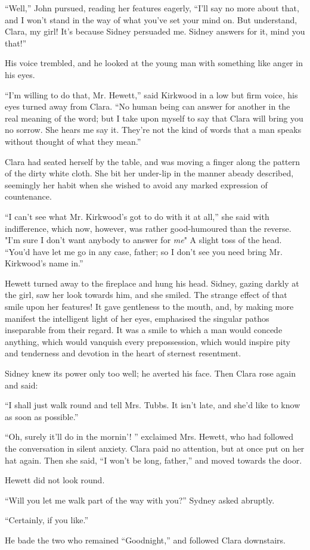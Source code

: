 ``Well,'' John pursued, reading her features eagerly, ``I'll say no more
about that, and I won't stand in the way of what you've set your mind
on. But understand, Clara, my girl! It's because Sidney persuaded me.
Sidney answers for it, mind you that!''

His voice trembled, and he looked at the young man with something like
anger in his eyes.

``I'm willing to do that, Mr. Hewett,'' said Kirkwood in a low but firm
voice, his eyes turned away from Clara. ``No human being can answer for
another in the real meaning of the word; but I take upon myself to say
that Clara will bring you no sorrow. She hears me say it. They're not
the kind of words that a man speaks without thought of what they mean.''

Clara had seated herself by the table, and was moving a finger along the
pattern of the dirty white cloth. She bit her under-lip in the manner
abeady described, seemingly {}her habit when she wished to avoid any
marked expression of countenance.

``I can't see what Mr. Kirkwood's got to do with it at all,'' she said
with indifference, which now, however, was rather good-humoured than the
reverse. "I'm sure I don't want anybody to answer for \emph{me}" A
slight toss of the head. ``You'd have let me go in any case, father; so
I don't see you need bring Mr. Kirkwood's name in.''

Hewett turned away to the fireplace and hung his head. Sidney, gazing
darkly at the girl, saw her look towards him, and she smiled. The
strange effect of that smile upon her features! It gave gentleness to
the mouth, and, by making more manifest the intelligent light of her
eyes, emphasised the singular pathos inseparable from their regard. It
was a smile to which a man would concede anything, which would vanquish
every prepossession, which would inspire pity and tenderness and
devotion in the heart of sternest resentment.

Sidney knew its power only too well; he {}averted his face. Then Clara
rose again and said:

``I shall just walk round and tell Mrs. Tubbs. It isn't late, and she'd
like to know as soon as possible.''

``Oh, surely it'll do in the mornin'! '' exclaimed Mrs. Hewett, who had
followed the conversation in silent anxiety. Clara paid no attention,
but at once put on her hat again. Then she said, ``I won't be long,
father,'' and moved towards the door.

Hewett did not look round.

``Will you let me walk part of the way with you?'' Sydney asked
abruptly.

``Certainly, if you like.''

He bade the two who remained ``Goodnight,'' and followed Clara
downstairs.
